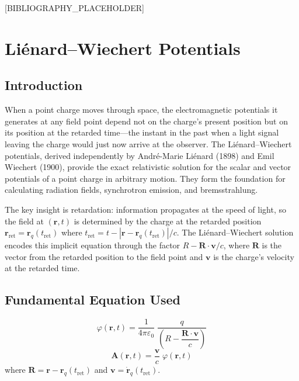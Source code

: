 \documentclass[11pt,openright]{book}
\begin{document}
[BIBLIOGRAPHY_PLACEHOLDER]


\chapter{Liénard--Wiechert Potentials}

\section*{Introduction}

When a point charge moves through space, the electromagnetic potentials it generates at any field point depend not on the charge's present position but on its position at the retarded time---the instant in the past when a light signal leaving the charge would just now arrive at the observer. The Liénard--Wiechert potentials, derived independently by André-Marie Liénard (1898) and Emil Wiechert (1900), provide the exact relativistic solution for the scalar and vector potentials of a point charge in arbitrary motion. They form the foundation for calculating radiation fields, synchrotron emission, and bremsstrahlung.

The key insight is retardation: information propagates at the speed of light, so the field at $(\mathbf{r}, t)$ is determined by the charge at the retarded position $\mathbf{r}_{\text{ret}} = \mathbf{r}_{q}(t_{\text{ret}})$ where $t_{\text{ret}} = t - |\mathbf{r} - \mathbf{r}_{q}(t_{\text{ret}})|/c$. The Liénard--Wiechert solution encodes this implicit equation through the factor $R - \mathbf{R}\cdot\mathbf{v}/c$, where $\mathbf{R}$ is the vector from the retarded position to the field point and $\mathbf{v}$ is the charge's velocity at the retarded time.
\section*{Fundamental Equation Used}

\begin{equation}
\boxed{\;\varphi(\mathbf{r},t) = \frac{1}{4\pi\varepsilon_{0}}\;\frac{q}{\left(R - \dfrac{\mathbf{R}\cdot\mathbf{v}}{c}\right)}\;}
\label{eq:lienard-wiechert-phi}
\end{equation}
\begin{equation}
\boxed{\;\mathbf{A}(\mathbf{r},t) = \frac{\mathbf{v}}{c}\;\varphi(\mathbf{r},t)\;}
\label{eq:lienard-wiechert-A}
\end{equation}
where $\mathbf{R} = \mathbf{r} - \mathbf{r}_{q}(t_{\text{ret}})$ and $\mathbf{v} = \dot{\mathbf{r}}_{q}(t_{\text{ret}})$.
\end{document}
